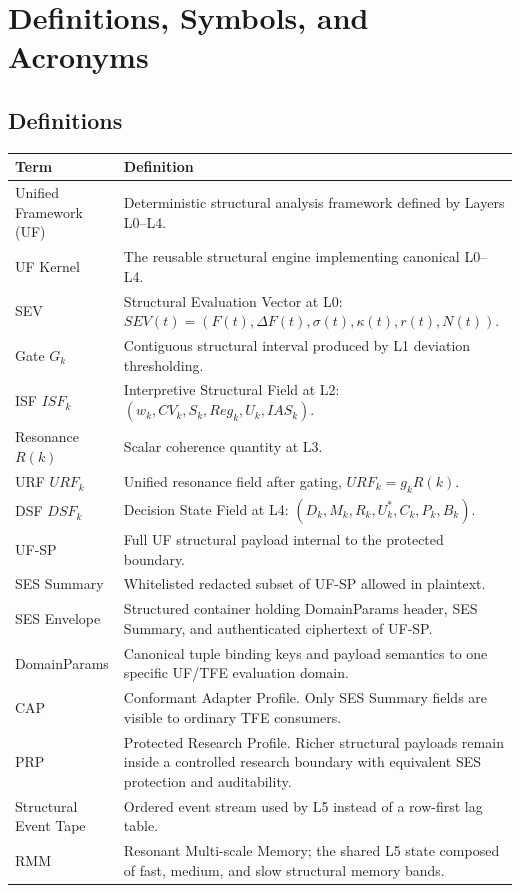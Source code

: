 \chapter{Definitions, Symbols, and Acronyms}
\section{Definitions}
\begin{longtable}{p{}p{}}
\toprule
Term & Definition \\
\midrule
Unified Framework (UF) & Deterministic structural analysis framework defined by Layers L0--L4. \\
UF Kernel & The reusable structural engine implementing canonical L0--L4. \\
SEV & Structural Evaluation Vector at L0: $SEV(t)=(F(t),\Delta F(t),\sigma(t),\kappa(t),r(t),N(t))$. \\
Gate $G_k$ & Contiguous structural interval produced by L1 deviation thresholding. \\
ISF $ISF_k$ & Interpretive Structural Field at L2: $(w_k,CV_k,S_k,Reg_k,U_k,IAS_k)$. \\
Resonance $R(k)$ & Scalar coherence quantity at L3. \\
URF $URF_k$ & Unified resonance field after gating, $URF_k=g_kR(k)$. \\
DSF $DSF_k$ & Decision State Field at L4: $(D_k,M_k,R_k,U_k^{\ast},C_k,P_k,B_k)$. \\
UF-SP & Full UF structural payload internal to the protected boundary. \\
SES Summary & Whitelisted redacted subset of UF-SP allowed in plaintext. \\
SES Envelope & Structured container holding DomainParams header, SES Summary, and authenticated ciphertext of UF-SP. \\
DomainParams & Canonical tuple binding keys and payload semantics to one specific UF/TFE evaluation domain. \\
CAP & Conformant Adapter Profile. Only SES Summary fields are visible to ordinary TFE consumers. \\
PRP & Protected Research Profile. Richer structural payloads remain inside a controlled research boundary with equivalent SES protection and auditability. \\
Structural Event Tape & Ordered event stream used by L5 instead of a row-first lag table. \\
RMM & Resonant Multi-scale Memory; the shared L5 state composed of fast, medium, and slow structural memory bands. \\

\end{longtable}
